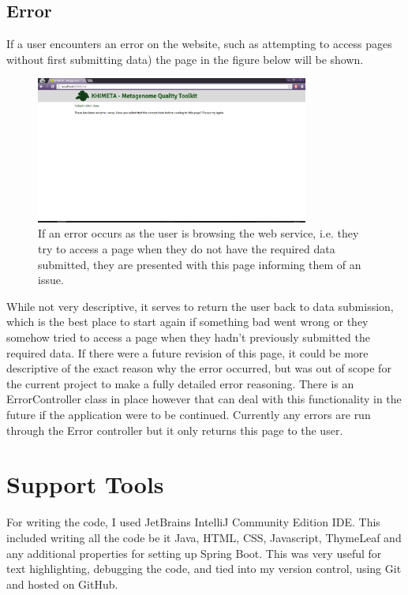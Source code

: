 \subsection{Error}
If a user encounters an error on the website, such as attempting to access pages without first submitting data) the page in the figure below will be shown.
\begin{figure}[H]
	\centering
\includegraphics[width=0.8\textwidth]{images/ui10}
\caption{If an error occurs as the user is browsing the web service, i.e. they try to access a page when they do not have the required data submitted, they are presented with this page informing them of an issue.}
\end{figure}
While not very descriptive, it serves to return the user back to data submission, which is the best place to start again if something bad went wrong or they somehow tried to access a page when they hadn't previously submitted the required data. If there were a future revision of this page, it could be more descriptive of the exact reason why the error occurred, but was out of scope for the current project to make a fully detailed error reasoning. There is an ErrorController class in place however that can deal with this functionality in the future if the application were to be continued. Currently any errors are run through the Error controller but it only returns this page to the user.

\section{Support Tools}
For writing the code, I used JetBrains IntelliJ Community Edition IDE. This included writing all the code be it Java, HTML, CSS, Javascript, ThymeLeaf and any additional properties for setting up Spring Boot. This was very useful for text highlighting, debugging the code, and tied into my version control, using Git and hosted on GitHub.

